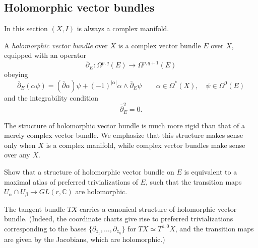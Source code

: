 \documentclass[12pt,letterpaper,reqno]{amsart}
\numberwithin{equation}{section}
\newcommand{\C}{\ensuremath{\mathbb C}}
\newcommand{\de}{\mathrm{d}}
\newcommand{\abs}[1]{\lvert#1\rvert}
\newcommand{\ti}[1]{\textit{#1}}
\begin{document}
\subsection{Holomorphic vector bundles}

In this section $(X,I)$ is always a complex manifold.

\begin{defn} A \ti{holomorphic vector bundle} over $X$ is a complex vector bundle $E$ over $X$, equipped with an operator
\begin{equation}
  \bar\partial_E :  \Omega^{p,q}(E) \to \Omega^{p,q+1}(E)
\end{equation}
obeying
\begin{equation}
  \bar\partial_E (\alpha \psi) = (\bar\partial \alpha) \psi + (-1)^{\abs{\alpha}} \alpha \wedge \bar\partial_E \psi \qquad \alpha \in \Omega^*(X), \quad \psi \in \Omega^0(E)
\end{equation}
and the integrability condition
\begin{equation}
  \bar\partial_E^2 = 0.
\end{equation}
\end{defn}


The structure of holomorphic vector bundle is much 
more rigid than that of a merely complex vector bundle.
We emphasize that this structure makes sense only when $X$ is 
a complex manifold, while complex vector bundles make sense 
over any $X$. 

\begin{exercise} Show that a structure of holomorphic vector bundle on $E$ is equivalent to a maximal atlas 
of preferred trivializations of $E$, such that
the transition maps 
$U_\alpha \cap U_\beta \to GL(r,\C)$ 
are holomorphic.
\end{exercise}


\begin{example} The tangent bundle $TX$ carries
a canonical structure of holomorphic vector bundle.
(Indeed, the coordinate charts give rise to 
preferred trivializations corresponding 
to the bases $\{\partial_{z_1}, \dots, \partial_{z_n} \}$
for $TX \simeq T^{1,0} X$, and the transition 
maps are given 
by the Jacobians, which are holomorphic.)
\end{example}
\end{document}
